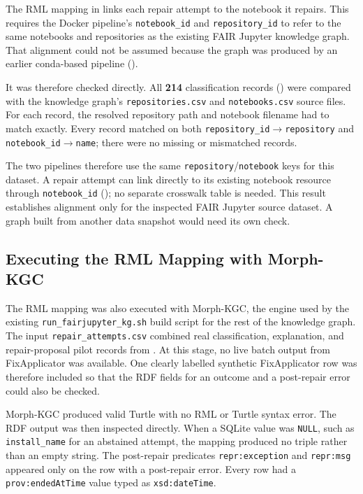 \begin{sloppypar}
The RML mapping in  links each repair attempt
to the notebook it repairs. This requires the Docker pipeline's
\texttt{notebook\_id} and \texttt{repository\_id} to refer to the same
notebooks and repositories as the existing FAIR Jupyter knowledge graph.
That alignment could not be assumed because the graph was produced by an
earlier conda-based pipeline ().

It was therefore checked directly. All \textbf{214} classification records
() were compared with the knowledge graph's
\texttt{repositories.csv} and \texttt{notebooks.csv} source files. For each
record, the resolved repository path and notebook filename had to match
exactly. Every record matched on both
\texttt{repository\_id}$\to$\texttt{repository} and
\texttt{notebook\_id}$\to$\texttt{name}; there were no missing or
mismatched records.
\end{sloppypar}

The two pipelines therefore use the same
\texttt{repository}/\texttt{notebook} keys for this dataset. A repair attempt
can link directly to its existing notebook resource through
\texttt{notebook\_id} (); no separate
crosswalk table is needed. This result establishes alignment only for the
inspected FAIR Jupyter source dataset. A graph built from another data snapshot
would need its own check.

\subsection{Executing the RML Mapping with Morph-KGC}
\label{sec:v-i6-morphkgc}

\begin{sloppypar}
The RML mapping was also executed with Morph-KGC, the engine used by the
existing \texttt{run\_fairjupyter\_kg.sh} build script for the rest of the
knowledge graph. The input \texttt{repair\_attempts.csv} combined real
classification, explanation, and repair-proposal pilot records from
. At this stage, no live batch output from FixApplicator was
available. One clearly labelled synthetic FixApplicator row was therefore
included so that the RDF fields for an outcome and a post-repair error could
also be checked.
\end{sloppypar}

Morph-KGC produced valid Turtle with no RML or Turtle syntax error. The RDF
output was then inspected directly. When a SQLite value was \texttt{NULL},
such as \texttt{install\_name} for an abstained attempt, the mapping produced
no triple rather than an empty string. The post-repair predicates
\texttt{repr:exception} and \texttt{repr:msg} appeared only on the row with a
post-repair error. Every row had a \texttt{prov:endedAtTime} value typed as
\texttt{xsd:dateTime}.

